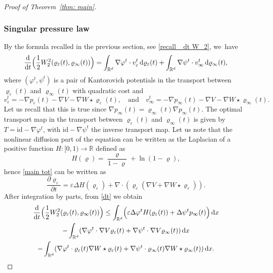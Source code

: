\documentclass[10pt]{amsart}
\newcommand{\Bprt}[1]{\Bigl(#1\Bigr)}
\newcommand{\partialt}[1]{\dfrac{\partial#1}{\partial t}}
\newcommand{\dx}[1]{\mathop{}\!\mathrm{d} #1}
\newcommand{\ddt}{\frac{\dx{}}{\dx{t}}}
\newcommand{\R}{\mathbb{R}}
\theoremstyle{plain}
\theoremstyle{remark}
\begin{document}
\begin{proof}[Proof of Theorem~\ref{thm: main}]
\subsubsection*{Singular pressure law}
By the formula recalled in the previous section, see \eqref{recall_ dt W_2}, we~have\enlargethispage{-3\baselineskip}
\begin{equation}\label{dt}
\ddt \Bprt{\frac 12 W_2^2(\varrho_\varepsilon(t), \varrho_\infty(t))} = \int_{\R^d} \nabla \varphi^t \cdot v^t_\varepsilon \dx{\varrho_\varepsilon(t)} + \int_{\R^d} \nabla \psi^t \cdot v^t_\infty \dx{\varrho_\infty(t)},
\end{equation}
where $(\varphi^t, \psi^t)$ is a pair of Kantorovich potentials in the transport between $\varrho_\varepsilon(t)$ and $\varrho_\infty(t)$ with quadratic cost and
\[
v^t_\varepsilon = -\nabla p_\varepsilon(t) - \nabla V - \nabla W \star \varrho_\varepsilon(t),\quad \text{and}\quad v^t_\infty = -\nabla p_\infty(t) - \nabla V - \nabla W \star \varrho_\infty(t).
\]
Let us recall that this is true since $\nabla p_\infty(t) = \varrho_\infty(t)\nabla p_\infty(t)$.
The optimal transport map in the transport between $\varrho_\varepsilon(t)$ and $\varrho_\infty(t)$ is given by $T= \mathrm{id} - \nabla \varphi^t$, with $\mathrm{id} - \nabla \psi^t$ the inverse transport map.
Let us note that the nonlinear diffusion part of the equation can be written as the Laplacian of a positive function $H:[0,1)\to\R$ defined as
\begin{equation}\label{eq: H}
H(\varrho) = \frac{\varrho}{1-\varrho} + \ln (1-\varrho),
\end{equation}
hence \eqref{main tot} can be written as
\begin{equation*}\label{main tot es}
\partialt{\varrho_\varepsilon} = \varepsilon\Delta H(\varrho_\varepsilon)+ \nabla \cdot(\varrho_\varepsilon( \nabla V + \nabla W \star \varrho_\varepsilon)).
\end{equation*}
After integration by parts, from \eqref{dt} we obtain
\begin{multline}\label{dt W2}
\ddt \Bigl(\frac 12 W_2^2(\varrho_\varepsilon(t), \varrho_\infty(t))\Bigr)
\leq \int_{\R^d} \Bprt{\varepsilon \Delta \varphi^t H(\varrho_\varepsilon(t)) +\Delta \psi^t p_\infty(t) }\dx x\\
- \int_{\R^d} (\nabla \varphi^t \cdot \nabla V \varrho_\varepsilon(t) + \nabla \psi^t \cdot \nabla V \varrho_\infty(t)) \dx x\\
- \int_{\R^d} (\nabla \varphi^t \cdot \varrho_\varepsilon(t)\nabla W\star \varrho_\varepsilon(t) +\nabla \psi^t \cdot \varrho_\infty(t)\nabla W\star \varrho_\infty(t)) \dx x.

\end{multline}
\end{proof}
\end{document}
